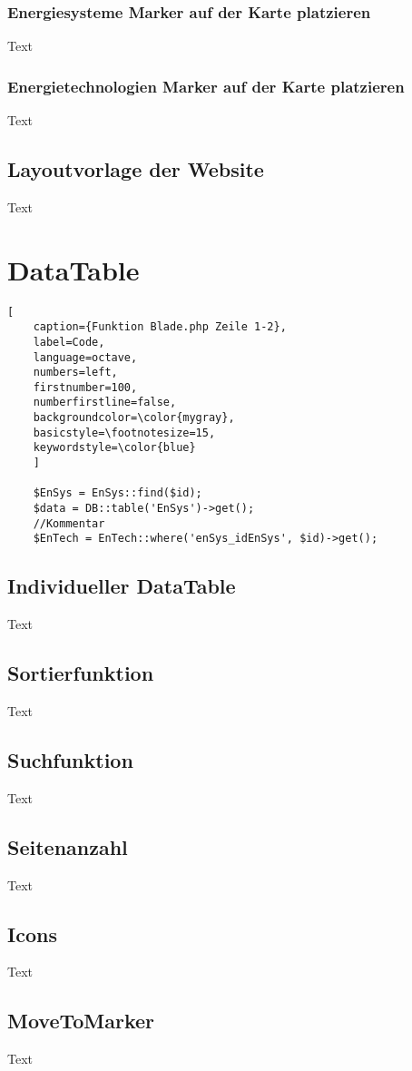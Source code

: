 \subsubsection{Energiesysteme Marker auf der Karte platzieren}
Text
\subsubsection{Energietechnologien Marker auf der Karte platzieren}
Text

\subsection{Layoutvorlage der Website}
Text



\section{DataTable}
\renewcommand{\lstlistingname}{Quellcode}

\begin{lstlisting}[
	caption={Funktion Blade.php Zeile 1-2},
	label=Code,
	language=octave,
	numbers=left,
	firstnumber=100,
	numberfirstline=false,
	backgroundcolor=\color{mygray},
	basicstyle=\footnotesize=15,
	keywordstyle=\color{blue}
	]
	
	$EnSys = EnSys::find($id);
	$data = DB::table('EnSys')->get();
	//Kommentar
	$EnTech = EnTech::where('enSys_idEnSys', $id)->get();
\end{lstlisting}
\subsection{Individueller DataTable}
Text
\subsection{Sortierfunktion}
Text
\subsection{Suchfunktion}
Text
\subsection{Seitenanzahl}
Text
\subsection{Icons}
Text
\subsection{MoveToMarker}
Text


